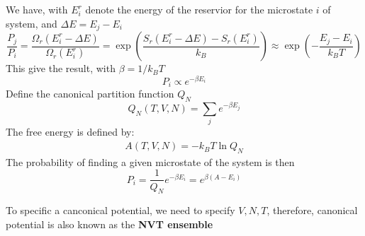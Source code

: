 \documentclass{article}
\begin{document}
We have, with $E^r_i$ denote the energy of the reservior for 
the microstate $i$ of system, and $\Delta E = E_j - E_i$
\begin{equation}
    \frac{P_j}{P_i} = \frac{\Omega_r(E^r_i - \Delta E)}{\Omega_r(E^r_i)} = \exp\left( \frac{S_r(E^r_i-\Delta E)-S_r(E^r_i)}{k_B} \right)
    \approx \exp\left( -\frac{E_j-E_i}{k_BT} \right)
\end{equation}
This give the result, with $\beta = 1/k_BT$
\begin{equation}
    P_i \propto e^{-\beta E_i}
\end{equation}
Define the canonical partition function $Q_N$
\begin{equation}
    Q_N(T,V,N) = \sum_j e^{-\beta E_j}
\end{equation}
The free energy is defined by:
\begin{gather}
    A(T,V,N) = -k_BT\ln Q_N
\end{gather}
The probability of finding a given microstate of the system is then
\begin{equation}
    P_i = \frac{1}{Q_N} e^{-\beta E_i} = e^{\beta(A - E_i)}
\end{equation}

To specific a canconical potential, we need to specify $V, N, T$, therefore, canonical potential 
is also known as the \textbf{NVT ensemble}
\end{document}
